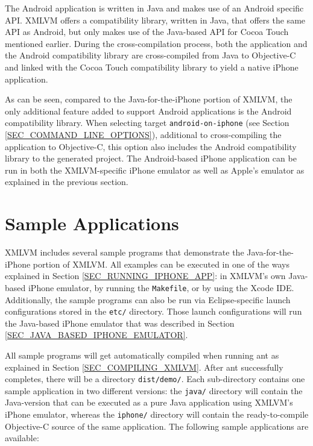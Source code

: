 \documentclass[11pt]{book}
\begin{document}
The Android application is written in Java and makes use of an Android
specific API. XMLVM offers a compatibility library, written in Java,
that offers the same API as Android, but only makes use of the
Java-based API for Cocoa Touch mentioned earlier. During the
cross-compilation process, both the application and the Android
compatibility library are cross-compiled from Java to Objective-C and
linked with the Cocoa Touch compatibility library to yield a native
iPhone application.

As can be seen, compared to the Java-for-the-iPhone portion of XMLVM,
the only additional feature added to support Android applications is
the Android compatibility library. When selecting target
\texttt{android-on-iphone} (see Section
\ref{SEC_COMMAND_LINE_OPTIONS}), additional to cross-compiling the
application to Objective-C, this option also includes the Android
compatibility library to the generated project.  The Android-based
iPhone application can be run in both the XMLVM-specific iPhone
emulator as well as Apple's emulator as explained in the previous
section.


\section{Sample Applications}
\label{SEC_IPHONE_SAMPLE_APPS}

XMLVM includes several sample programs that demonstrate the
Java-for-the-iPhone portion of XMLVM. All examples can be executed in
one of the ways explained in Section \ref{SEC_RUNNING_IPHONE_APP}: in
XMLVM's own Java-based iPhone emulator, by running the
\texttt{Makefile}, or by using the Xcode IDE. Additionally, the sample
programs can also be run via Eclipse-specific launch configurations
stored in the \texttt{etc/} directory. Those launch configurations
will run the Java-based iPhone emulator that was described in Section
\ref{SEC_JAVA_BASED_IPHONE_EMULATOR}.

All sample programs will get automatically compiled when running ant
as explained in Section \ref{SEC_COMPILING_XMLVM}. After ant
successfully completes, there will be a directory \texttt{dist/demo/}.
Each sub-directory contains one sample application in two different
versions: the \texttt{java/} directory will contain the Java-version
that can be executed as a pure Java application using XMLVM's iPhone
emulator, whereas the \texttt{iphone/} directory will contain the
ready-to-compile Objective-C source of the same application. The
following sample applications are available:
\end{document}
